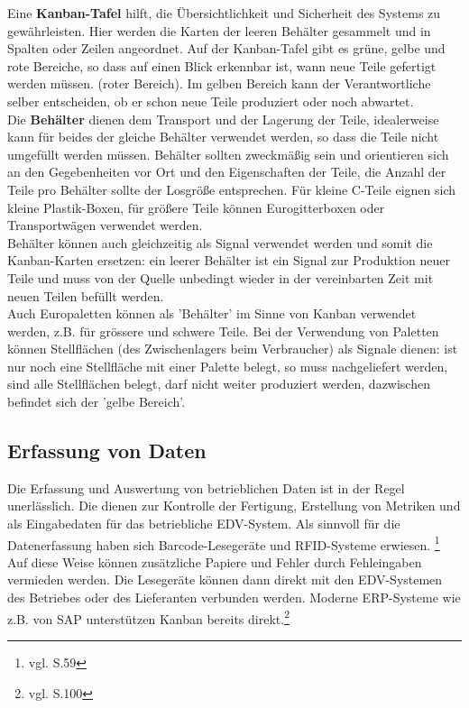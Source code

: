 Eine \textbf{Kanban-Tafel} hilft, die Übersichtlichkeit und Sicherheit des Systems zu gewährleisten. 
Hier werden die Karten der leeren Behälter gesammelt und in Spalten oder Zeilen angeordnet.  
Auf der Kanban-Tafel gibt es grüne, gelbe und rote Bereiche, so dass auf einen Blick erkennbar ist, wann neue Teile gefertigt werden müssen. (roter Bereich).
Im gelben Bereich kann der Verantwortliche selber entscheiden, ob er schon neue Teile produziert oder noch abwartet.\\

Die \textbf{Behälter} dienen dem Transport und der Lagerung der Teile, idealerweise kann für beides der gleiche 
Behälter verwendet werden, so dass die Teile nicht umgefüllt werden müssen. Behälter sollten 
zweckmäßig sein und orientieren sich an den Gegebenheiten vor Ort und den Eigenschaften der Teile, 
die Anzahl der Teile pro Behälter sollte der Losgröße entsprechen.
Für kleine C-Teile eignen sich kleine Plastik-Boxen, für größere Teile können Eurogitterboxen 
oder Transportwägen verwendet werden.\\
Behälter können auch gleichzeitig als Signal verwendet werden und somit die Kanban-Karten ersetzen: ein leerer 
Behälter ist ein Signal zur Produktion neuer Teile und muss von der Quelle unbedingt 
wieder in der vereinbarten Zeit mit neuen Teilen befüllt werden.\\
Auch Europaletten können als 'Behälter' im Sinne von Kanban verwendet werden, z.B. für grössere und schwere Teile.
Bei der Verwendung von Paletten können Stellflächen (des Zwischenlagers beim Verbraucher) als Signale dienen: 
ist nur noch eine Stellfläche mit einer Palette belegt, so muss nachgeliefert werden, sind alle Stellflächen belegt, 
darf nicht weiter produziert werden, dazwischen befindet sich der 'gelbe Bereich'.

\subsection{Erfassung von Daten}
Die Erfassung und Auswertung von betrieblichen Daten ist in der Regel unerlässlich.
Die dienen zur Kontrolle der Fertigung, Erstellung von Metriken und als Eingabedaten für das betriebliche EDV-System.
Als sinnvoll für die Datenerfassung haben sich Barcode-Lesegeräte und RFID-Systeme erwiesen. \footnote{vgl. \cite{Geiger2011Kanban} S.59}
Auf diese Weise können zusätzliche Papiere und Fehler durch Fehleingaben vermieden werden.
Die Lesegeräte können dann direkt mit den EDV-Systemen des Betriebes oder des Lieferanten verbunden werden.
Moderne ERP-Systeme wie z.B. von SAP unterstützen Kanban bereits direkt.\footnote{vgl. \cite{Weber2014KE} S.100}

